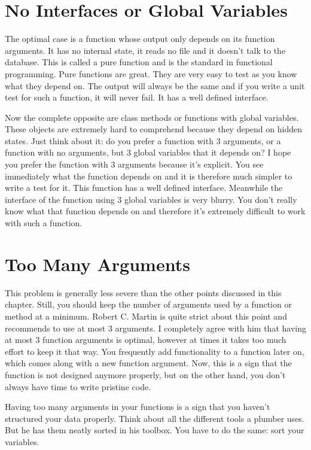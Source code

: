 \section{No Interfaces or Global Variables}

The optimal case is a function whose output only depends on its function arguments. It has no internal state, it reads no file and it doesn't talk to the database. This is called a pure function and is the standard in functional programming. Pure functions are great. They are very easy to test as you know what they depend on. The output will always be the same and if you write a unit test for such a function, it will never fail. It has a well defined interface.

Now the complete opposite are class methods or functions with global variables. These objects are extremely hard to comprehend because they depend on hidden states. Just think about it: do you prefer a function with 3 arguments, or a function with no arguments, but 3 global variables that it depends on? I hope you prefer the function with 3 arguments because it's explicit. You see immediately what the function depends on and it is therefore much simpler to write a test for it. This function has a well defined interface. Meanwhile the interface of the function using 3 global variables is very blurry. You don't really know what that function depends on and therefore it's extremely difficult to work with such a function.

\section{Too Many Arguments}

This problem is generally less severe than the other points discussed in this chapter. Still, you should keep the number of arguments used by a function or method at a minimum. Robert C. Martin is quite strict about this point and recommends to use at most 3 arguments. I completely agree with him that having at most 3 function arguments is optimal, however at times it takes too much effort to keep it that way. You frequently add functionality to a function later on, which comes along with a new function argument. Now, this is a sign that the function is not designed anymore properly, but on the other hand, you don't always have time to write pristine code.

Having too many arguments in your functions is a sign that you haven't structured your data properly. Think about all the different tools a plumber uses. But he has them neatly sorted in his toolbox. You have to do the same: sort your variables.

